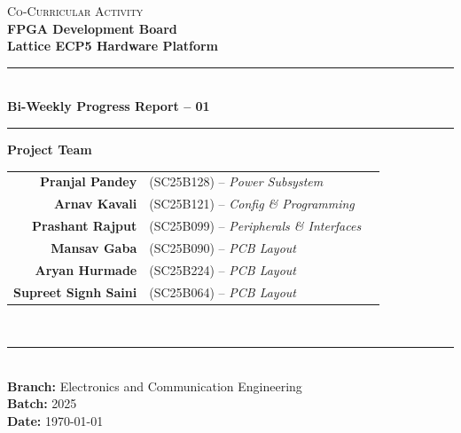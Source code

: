 \documentclass[12pt,a4paper]{article}
\begin{document}
\begin{titlepage}
    \vspace*{2.5cm}

    \begin{center}
        {\Large \textsc{Co-Curricular Activity}}\\[0.8cm]
        {\huge \textbf{FPGA Development Board}}\\[0.3cm]
        {\large \textbf{Lattice ECP5 Hardware Platform}}\\[1.2cm]
        \rule{0.6\textwidth}{0.8pt}\\[0.6cm]
        {\LARGE \textbf{Bi-Weekly Progress Report -- 01}}\\[0.6cm]
        \rule{0.6\textwidth}{0.8pt}
    \end{center}

    \vfill
    \begin{center}
        \begin{minipage}{0.58\textwidth}
            \center
            \textbf{\large Project Team}\\[0.25cm]
            \small
            \begin{tabular}{r l r}
                \textbf{Pranjal Pandey}      & (SC25B128) -- \textit{Power Subsystem} \\
                \textbf{Arnav Kavali}        & (SC25B121) -- \textit{Config \& Programming} \\
                \textbf{Prashant Rajput}     & (SC25B099) -- \textit{Peripherals \& Interfaces} \\
                \textbf{Mansav Gaba}         & (SC25B090) -- \textit{PCB Layout} \\
                \textbf{Aryan Hurmade}       & (SC25B224) -- \textit{PCB Layout} \\
                \textbf{Supreet Signh Saini} & (SC25B064) -- \textit{PCB Layout} \\
            \end{tabular}\\[0.4cm]
            \rule{\linewidth}{0.4pt}\\[0.2cm]
            \footnotesize
            \textbf{Branch:} Electronics and Communication Engineering\\
            \textbf{Batch:} 2025\\
            \textbf{Date:} \today
        \end{minipage}
    \end{center}

    \vspace*{1cm}
\end{titlepage}
\end{document}
